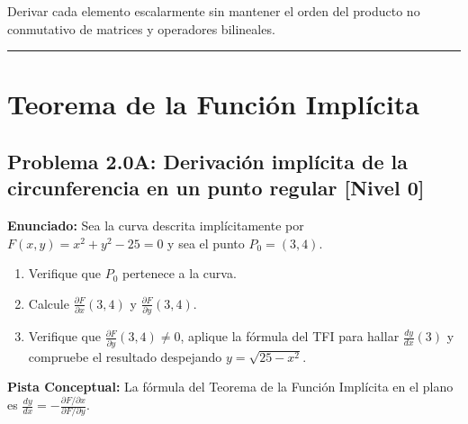 \documentclass[11pt,a4paper]{article}
\begin{document}
\begin{trapbox}
Derivar cada elemento escalarmente sin mantener el orden del producto no conmutativo de matrices y operadores bilineales.
\end{trapbox}

\vspace{0.5cm}
\hrule
\vspace{0.5cm}

\section{Teorema de la Función Implícita}

\subsection*{Problema 2.0A: Derivación implícita de la circunferencia en un punto regular \hfill \color{teal}\small[Nivel 0]}

\begin{tcolorbox}[colback=white,colframe=gray!40,arc=1mm,boxrule=0.5pt,left=3mm,right=3mm,top=2mm,bottom=2mm]
\textbf{Enunciado:} Sea la curva descrita implícitamente por $F(x,y) = x^2 + y^2 - 25 = 0$ y sea el punto $P_0 = (3,4)$.
\begin{enumerate}[label=\textbf{\alph*)}]
\item Verifique que $P_0$ pertenece a la curva.
\item Calcule $\frac{\partial F}{\partial x}(3,4)$ y $\frac{\partial F}{\partial y}(3,4)$.
\item Verifique que $\frac{\partial F}{\partial y}(3,4) \neq 0$, aplique la fórmula del TFI para hallar $\frac{dy}{dx}(3)$ y compruebe el resultado despejando $y = \sqrt{25 - x^2}$.
\end{enumerate}
\end{tcolorbox}

\begin{tcolorbox}[colback=yellow!4,colframe=accentamber!70,arc=1mm,boxrule=0.5pt,left=3mm,right=3mm,top=1.5mm,bottom=1.5mm]
\textbf{Pista Conceptual:} La fórmula del Teorema de la Función Implícita en el plano es $\frac{dy}{dx} = -\frac{\partial F / \partial x}{\partial F / \partial y}$.
\end{tcolorbox}
\end{document}
